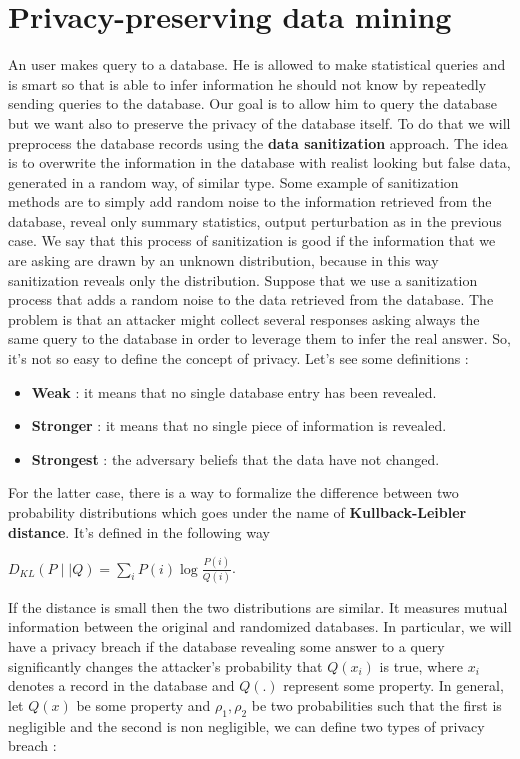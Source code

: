 \section{Privacy-preserving data mining}
An user makes query to a database. He is allowed to make statistical queries and is smart so that is able to infer information he should not know by repeatedly sending queries to the database. Our goal is to allow him to query the database but we want also to preserve the privacy of the database itself. To do that we will preprocess the database records using the \textbf{data sanitization} approach. The idea is to overwrite the information in the database with realist looking but false data, generated in a random way, of similar type. Some example of sanitization methods are to simply add random noise to the information retrieved from the database, reveal only summary statistics, output perturbation as in the previous case. We say that this process of sanitization is good if the information that we are asking are drawn by an unknown distribution, because in this way sanitization reveals only the distribution. Suppose that we use a sanitization process that adds a random noise to the data retrieved from the database. The problem is that an attacker might collect several responses asking always the same query to the database in order to leverage them to infer the real answer. So, it's not so easy to define the concept of privacy. Let's see some definitions :
\begin{itemize}
\item \textbf{Weak} : it means that no single database entry has been revealed.
\item \textbf{Stronger} : it means that no single piece of information is revealed.
\item \textbf{Strongest} : the adversary beliefs that the data have not changed.
\end{itemize}
For the latter case, there is a way to formalize the difference between two probability distributions which goes under the name of \textbf{Kullback-Leibler distance}. It's defined in the following way
\begin{center}
$D_{KL}(P \mid \mid Q) = \sum_{i} P(i) \log \frac{P(i)}{Q(i)}$.
\end{center} 
If the distance is small then the two distributions are similar. It measures mutual information between the original and randomized databases. In particular, we will have a privacy breach if the database revealing some answer to a query significantly changes the attacker's probability that $Q(x_{i})$ is true, where $x_{i}$ denotes a record in the database and $Q(.)$ represent some property. In general, let $Q(x)$ be some property and $\rho_{1}, \rho_{2}$ be two probabilities such that the first is negligible and the second is non negligible, we can define two types of privacy breach :
